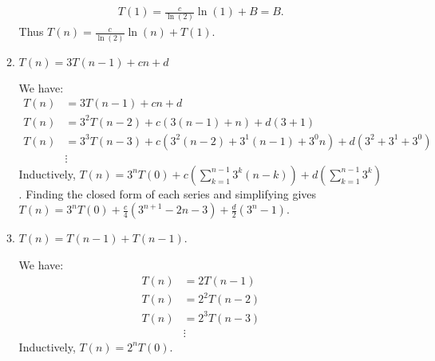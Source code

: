 \documentclass[11pt,twoside,openany]{memoir}
\begin{document}
\begin{enumerate}[label = (\roman*),itemsep=1pt,topsep=3pt]
\begin{enumerate}[label = (\Alph*),itemsep=4pt,topsep=4pt]
\begin{solution}
                        \begin{equation*}
                        \begin{split}
                            T(1) = \frac{c}{\ln(2)}\ln(1) + B = B.
                        \end{split}
                        \end{equation*}
                    Thus $T(n) = \frac{c}{\ln(2)}\ln(n) + T(1)$.
                \end{solution}
                \vspace{5pt}
            \item $T(n) = 3T(n-1) + cn + d$
                \vspace{5pt}
                \begin{solution}
                    We have:
                        \begin{equation*}
                        \begin{split}
                            T(n) &= 3T(n-1) + cn + d \\
                            T(n) &= 3^2T(n-2) + c(3(n-1) + n) + d(3 + 1) \\
                            T(n) & = 3^3T(n-3) + c(3^2(n-2) + 3^1(n-1) + 3^0n) + d(3^2 + 3^1 + 3^0) \\
                            &\vdots
                        \end{split}
                        \end{equation*}
                    Inductively, $T(n) = 3^n T(0) + c \left( \sum_{k = 1}^{n-1}3^k(n-k) \right) + d \left( \sum_{k = 1}^{n-1}3^k \right)$. Finding the closed form of each series and simplifying gives $T(n) = 3^n T(0) + \frac{c}{4}(3^{n+1}-2n - 3) + \frac{d}{2}(3^n - 1)$.
                \end{solution}
                \vspace{5pt}
            \item $T(n) = T(n-1) + T(n-1)$.
                \vspace{5pt}
                \begin{solution}
                    We have:
                        \begin{equation*}
                        \begin{split}
                            T(n) &= 2T(n-1) \\
                            T(n) &= 2^2T(n-2) \\
                            T(n) &=2^3 T(n-3) \\
                            &\vdots
                        \end{split}
                        \end{equation*}
                    Inductively, $T(n) = 2^nT(0)$.
                \end{solution}
                \vspace{5pt}
        \end{enumerate}
    \end{enumerate}




\end{document}

